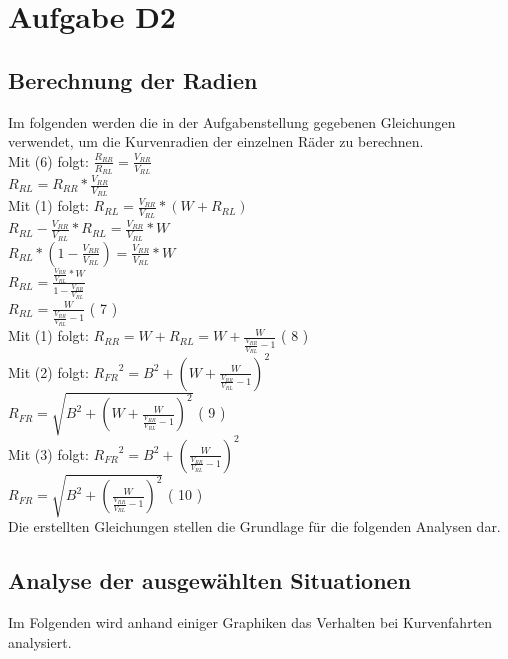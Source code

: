 \chapter{Aufgabe D2}

\section{Berechnung der Radien}
Im folgenden werden die in der Aufgabenstellung gegebenen Gleichungen verwendet, um die Kurvenradien der einzelnen Räder zu berechnen.\\

	Mit (6) folgt: $ \frac{R_{RR}}{R_{RL}} = \frac{V_{RR}}{V_{RL}}$  \\
	\hspace*{2.5cm}${R_{RL} = {R_{RR}} * \frac{V_{RR}}{V_{RL}}}$ \\
	Mit (1) folgt: ${R_{RL}} = \frac{V_{RR}}{V_{RL}} * (W+{R_{RL}})$ \\
	\hspace*{2.5cm}${R_{RL}}-\frac{V_{RR}}{V_{RL}}*{R_{RL}} = \frac{V_{RR}}{V_{RL}} * W $\\
	\hspace*{2.5cm}${R_{RL}}*(1-\frac{V_{RR}}{V_{RL}})= \frac{V_{RR}}{V_{RL}} * W $\\
	\hspace*{2.5cm}${R_{RL}}= \frac{\frac{V_{RR}}{V_{RL}} * W}{1-\frac{V_{RR}}{V_{RL}}}$ \\
	\hspace*{2.5cm}${R_{RL}}= \frac{W}{\frac{V_{RR}}{V_{RL}}-1}$    \hfill ( 7 )\\
	Mit (1) folgt: ${R_{RR}}= W + {R_{RL}} = W + \frac{W}{\frac{V_{RR}}{V_{RL}}-1}$  \hfill ( 8 )\\
	Mit (2) folgt: ${R_{FR}}^2= B^2 + (W + \frac{W}{\frac{V_{RR}}{V_{RL}}-1})^2$ \\
	\hspace*{2.5cm}${R_{FR}} = \sqrt{B^2 + (W + \frac{W}{\frac{V_{RR}}{V_{RL}}-1})^2}$ \hfill ( 9 )\\
	Mit (3) folgt: ${R_{FR}}^2= B^2 + (\frac{W}{\frac{V_{RR}}{V_{RL}}-1})^2$\\
	\hspace*{2.5cm}${R_{FR}} = \sqrt{B^2 + (\frac{W}{\frac{V_{RR}}{V_{RL}}-1})^2}$  \hfill ( 10 )\\ 
	
Die erstellten Gleichungen stellen die Grundlage für die folgenden Analysen dar.
\newpage
\section{Analyse der ausgewählten Situationen}
	Im Folgenden wird anhand einiger Graphiken das Verhalten bei Kurvenfahrten analysiert.
	
